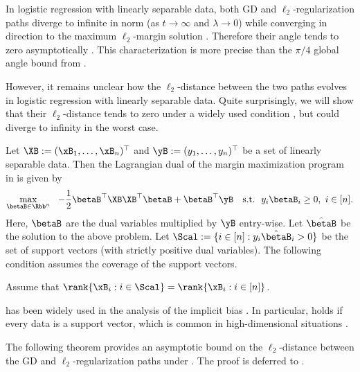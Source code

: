 \documentclass[11pt]{article}
\begin{document}
In logistic regression with linearly separable data, both GD and $\ell_2$-regularization paths diverge to infinite in norm (as $t\to\infty$ and $\lambda\to 0$) while converging in direction to the maximum $\ell_2$-margin solution \citep{rosset2004boosting,soudry2018implicit,ji2018risk,ji2020gradient}. 
Therefore their angle tends to zero asymptotically \citep{suggala2018connecting,ji2020gradient}. 
This characterization is more precise than the $\pi/4$ global angle bound from .

However, it remains unclear how the $\ell_2$-distance between the two paths evolves in logistic regression with linearly separable data.
Quite surprisingly, we will show that their $\ell_2$-distance tends to zero under a widely used condition \citep{soudry2018implicit,ji2021characterizing,wu2023implicit}, but could diverge to infinity in the worst case. 

Let $\XB := (\xB_1,\dots,\xB_n)^\top$ and $\yB:=(y_1,\dots,y_n)^\top$ be a set of linearly separable data.
Then the Lagrangian dual of the margin maximization program in  is given by \citep[see][for example]{hsu2021proliferation} 
\begin{align*}
    \max_{\betaB \in \Rbb^n}\ \  -\frac{1}{2}\betaB^\top \XB\XB^\top\betaB + \betaB^\top \yB \quad
    \text{s.t.}\ \  y_i \betaB_i \ge 0,\ i\in[n].
\end{align*}
Here, $\betaB$ are the dual variables multiplied by $\yB$ entry-wise.
Let $\hat\betaB$ be the solution to the above problem. 
Let $\Scal := \{i\in [n]: y_i \hat\betaB_i > 0\}$ be the set of support vectors (with strictly positive dual variables). 
The following condition assumes the coverage of the support vectors.

\begin{assumption}
\label{assump:full-rank-support}
Assume that $\rank\{\xB_i: i \in \Scal\} = \rank\{\xB_i: i \in [n]\}$.
\end{assumption}

 has been widely used in the analysis of the implicit bias \citep{soudry2018implicit,ji2021characterizing,wu2023implicit}.
In particular,  holds if every data is a support vector, which is common in high-dimensional situations \citep{hsu2021proliferation,wang2022binary,cao2021risk}.

The following theorem provides an asymptotic bound on the $\ell_2$-distance between the GD and $\ell_2$-regularization paths under . The proof is deferred to .
\end{document}
